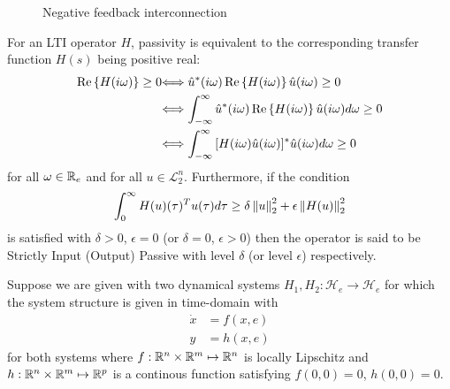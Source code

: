 \begin{figure}%
\centering
{}
\caption{Negative feedback interconnection}%
\label{fig:apdx:passint}%
\end{figure}

\begin{define}For an LTI operator $H$, passivity is equivalent to the corresponding transfer function $H(s)$ being positive real:
\begin{align*}
{\operatorname{Re}\left\{ H(i\omega) \right\}\geq 0} &{\Longleftrightarrow
\hat{u}^*(i\omega) \operatorname{Re}\left\{ H(i\omega) \right\}\hat{u}(i\omega) \geq 0}\\
&{\Longleftrightarrow \int_{-\infty}^\infty{\hat{u}^*(i\omega)\operatorname{Re}\left\{ H(i\omega) \right\} \hat{u}(i\omega)d\omega} \geq 0}\\
&{\Longleftrightarrow \int_{-\infty}^\infty{{[H(i\omega)\hat{u}(i\omega)]^*}\hat{u}(i\omega)d\omega} \geq 0}
\end{align*}
for all $\omega\in\mathbb{R}_e$ and for all $u\in\mathcal{L}_{2}^n$. Furthermore, if the condition
\[
\int_0^\infty{H(u)(\tau)^Tu(\tau)d\tau} \geq \delta\displaystyle \left\| u \right\|_2^2 + \epsilon\displaystyle \left\| H(u) \right\|_2^2
\]
is satisfied with $\delta > 0$, $\epsilon = 0$ (or $\delta = 0$, $\epsilon > 0$) then the operator is said to be Strictly Input 
(Output) Passive with level $\delta$ (or level $\epsilon$) respectively. 
\end{define}



Suppose we are given with two dynamical systems $H_1,H_2: \mathcal{H}_e\to\mathcal{H}_e$ for which the system structure is given in time-domain with 
\begin{align}
\dot{x} &= f(x,e)\\
y &= h(x,e)
\end{align}
for both systems where $f: \mathbb{R}^n\times\mathbb{R}^m\mapsto \mathbb{R}^n$ is locally Lipschitz and $h: \mathbb{R}^n\times\mathbb{R}^m\mapsto \mathbb{R}^p$
is a continous function satisfying $f(0,0)=0$, $h(0,0)=0$. 

